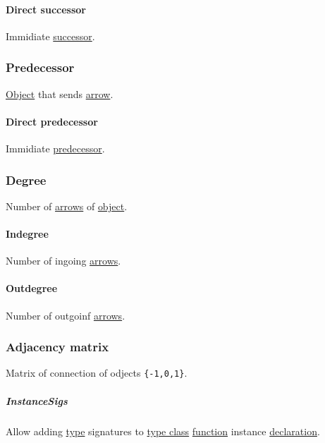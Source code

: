 \documentclass[11pt]{article}
\begin{document}
\paragraph{\label{org9c964c8}Direct successor}
\label{sec:org9051ea4}
Immidiate \hyperref[org008a3bd]{successor}.\\

\subsubsection{\label{orgdb1bab7}Predecessor}
\label{sec:orgc509bf6}
\hyperref[org025aac8]{Object} that sends \hyperref[org5b6e6e9]{arrow}.\\

\paragraph{\label{orgda5e9e3}Direct predecessor}
\label{sec:org9a3451c}
Immidiate \hyperref[orgdb1bab7]{predecessor}.\\


\subsubsection{\label{org3e1d054}Degree}
\label{sec:org8b1d006}
Number of \hyperref[org33f3f3f]{arrows} of \hyperref[org025aac8]{object}.\\

\paragraph{\label{orgf19d4be}Indegree}
\label{sec:org9047639}
Number of ingoing \hyperref[org33f3f3f]{arrows}.\\

\paragraph{\label{org9010489}Outdegree}
\label{sec:org7225d2d}
Number of outgoinf \hyperref[org33f3f3f]{arrows}.\\

\subsubsection{\label{org9576751}Adjacency matrix}
\label{sec:org9428fc8}
Matrix of connection of odjects \texttt{\{-1,0,1\}}.\\

\subparagraph{\label{orgf890c2d}InstanceSigs}
\label{sec:org3080453}
Allow adding \hyperref[org4fbaeb8]{type} signatures to \hyperref[orga4a5066]{type class} \hyperref[orgeb5cddb]{function} instance \hyperref[org56ef1b9]{declaration}.\\
\end{document}
